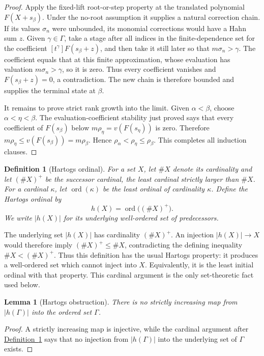 \documentclass[11pt]{article}
\newcommand{\Val}{v}
\newcommand{\namedref}[2]{\hyperref[#2]{#1~\ref*{#2}}}
\theoremstyle{proofnote}
\newtheorem{lemma}[theorem]{Lemma}
\newtheorem{definition}[theorem]{Definition}
\begin{document}
\begin{proof}
  Apply the fixed-lift root-or-step property at the translated polynomial
  \(F(X+s_\beta)\).  Under the no-root assumption it supplies a natural
  correction chain.  If its values \(\sigma_n\) were unbounded, its monomial
  corrections would have a Hahn sum \(z\).  Given \(\gamma\in\Gamma\), take
  a stage after all indices in the finite-dependence set for the coefficient
  \([t^\gamma]F(s_\beta+z)\), and then take it still later so that
  \(m\sigma_n>\gamma\).  The coefficient equals that at this finite
  approximation, whose evaluation has valuation \(m\sigma_n>\gamma\), so it
  is zero.  Thus every coefficient vanishes and \(F(s_\beta+z)=0\), a
  contradiction.  The new chain is therefore bounded and supplies the
  terminal state at \(\beta\).

  It remains to prove strict rank growth into the limit.  Given
  \(\alpha<\beta\), choose \(\alpha<\eta<\beta\).  The evaluation-coefficient
  stability just proved says that every coefficient of \(F(s_\beta)\) below
  \(m\rho_\eta=\Val(F(s_\eta))\) is zero.  Therefore
  \(m\rho_\eta\le\Val(F(s_\beta))=m\rho_\beta\).  Hence
  \(\rho_\alpha<\rho_\eta\le\rho_\beta\).  This completes all induction
  clauses.
\end{proof}

\begin{definition}[Hartogs ordinal]
\label{def:hartogs}
  For a set \(X\), let \(\#X\) denote its cardinality and let
  \((\#X)^+\) be the successor cardinal, the least cardinal strictly larger
  than \(\#X\).  For a cardinal \(\kappa\), let \(\operatorname{ord}(\kappa)\)
  be the least ordinal of cardinality \(\kappa\).  Define the
  \emph{Hartogs ordinal} by
  \[
    h(X)=\operatorname{ord}\bigl((\#X)^+\bigr).
  \]
  We write \(|h(X)|\) for its underlying well-ordered set of predecessors.
\end{definition}

The underlying set \(|h(X)|\) has cardinality \((\#X)^+\).  An injection
\(|h(X)|\to X\) would therefore imply
\((\#X)^+\le\#X\), contradicting the defining inequality
\(\#X<(\#X)^+\).  Thus this definition has the usual Hartogs property: it
produces a well-ordered set which cannot inject into \(X\).  Equivalently, it
is the least initial ordinal with that property.  This cardinal argument is
the only set-theoretic fact used below.

\begin{lemma}[Hartogs obstruction]
\label{lem:hartogs}
  There is no strictly increasing map from \(|h(\Gamma)|\) into the ordered
  set \(\Gamma\).
\end{lemma}
\begin{proof}
  A strictly increasing map is injective, while the cardinal argument after
  \namedref{Definition}{def:hartogs} says that no injection from
  \(|h(\Gamma)|\) into the underlying set of \(\Gamma\) exists.
\end{proof}
\end{document}
